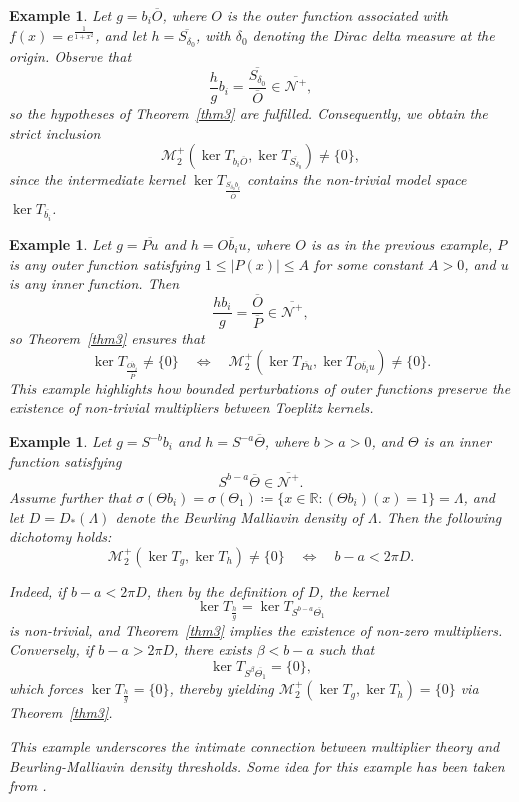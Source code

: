 \documentclass[12pt,a4paper]{amsart}
\newtheorem{Example}[Definition]{Example}
\begin{document}
\begin{Example}
	\normalfont
Let \( g = b_i \overline{O} \), where \( O \) is the outer function associated with \( f(x) = e^{\frac{1}{1 + x^2}} \), and let \( h = \overline{S_{\delta_0}} \), with \( \delta_0 \) denoting the Dirac delta measure at the origin. Observe that
\[
\frac{h}{g} b_i = \frac{\overline{S_{\delta_0}}}{\overline{O}} \in \overline{\mathcal{N}^+},
\]
so the hypotheses of Theorem~\ref{thm3} are fulfilled. Consequently, we obtain the strict inclusion
\[
\mathcal{M}_2^+(\ker T_{b_i \overline{O}}, \ker T_{\overline{S_{\delta_0}}}) \neq \{0\},
\]
since the intermediate kernel \( \ker T_{\frac{\overline{S_{\delta_0}} b_i}{\overline{O}}} \) contains the non-trivial model space \( \ker T_{\overline{b_i}} \).
\end{Example}

\begin{Example}
	\normalfont
Let \( g = \overline{P u }\) and \( h = \overline{O b_i u} \), where \( O \) is as in the previous example, \( P \) is any outer function satisfying \( 1 \leq |P(x)| \leq A \) for some constant \( A > 0 \), and $u$ is any inner function. Then
\[
\frac{h b_i}{g} = \frac{\overline{O}}{\overline{P}} \in \overline{\mathcal{N}^+},
\]
so Theorem~\ref{thm3} ensures that
\[
\ker T_{\frac{\overline{O b_i}}{\overline P} }\neq \{0\} \quad \Longleftrightarrow \quad \mathcal{M}_2^+(\ker T_{\overline{P u}}, \ker T_{\overline{O b_i u}}) \neq \{0\}.
\]
This example highlights how bounded perturbations of outer functions preserve the existence of non-trivial multipliers between Toeplitz kernels.
\end{Example}

\begin{Example}\label{example4}
	\normalfont
Let \( g = S^{-b} b_i \) and \( h = S^{-a} \overline{\Theta} \), where \( b > a > 0 \), and \( \Theta \) is an inner function satisfying
\[
S^{b - a} \overline{\Theta} \in \overline{\mathcal{N}^+}.
\]
Assume further that \( \sigma(\Theta b_i) = \sigma(\Theta_1) \coloneqq \{ x \in \mathbb{R} : (\Theta b_i)(x) = 1 \} = \Lambda \), and let \( D = D_*(\Lambda) \) denote the Beurling Malliavin density of \( \Lambda \). Then the following dichotomy holds:
\[
\mathcal{M}_2^+(\ker T_g, \ker T_h) \neq \{0\} \quad \Longleftrightarrow \quad b - a < 2\pi D.
\]

Indeed, if \( b - a < 2\pi D \), then by the definition of \( D \), the kernel
\[
\ker T_{\frac{h}{g}} = \ker T_{S^{b - a} \overline{\Theta_1}}
\]
is non-trivial, and Theorem~\ref{thm3} implies the existence of non-zero multipliers. Conversely, if \( b - a > 2\pi D \), there exists \( \beta < b - a \) such that
\[
\ker T_{S^{\beta} \overline{\Theta_1}} = \{0\},
\]
which forces \( \ker T_{\frac{h}{g}} = \{0\} \), thereby yielding \( \mathcal{M}_2^+(\ker T_g, \ker T_h) = \{0\} \) via Theorem~\ref{thm3}.

This example underscores the intimate connection between multiplier theory and Beurling-Malliavin density thresholds. Some idea for this example has been taken from \cite{FRR18}.
\end{Example}
\end{document}
